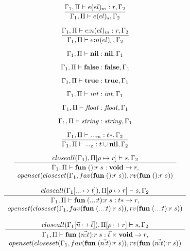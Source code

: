 \[
\dfrac{\Gamma_{1}, \Pi \vdash e(el)_{m}:r, \Gamma_{2}}
      {\Gamma_{1}, \Pi \vdash e(el)_{s},\Gamma_{2}}
\]

\[
\dfrac{\Gamma_{1}, \Pi \vdash e{:}n(el)_{m}:r, \Gamma_{2}}
      {\Gamma_{1}, \Pi \vdash e{:}n(el)_{s},\Gamma_{2}}
\]

\[
\Gamma_{1}, \Pi \vdash \mathbf{nil}:\mathbf{nil}, \Gamma_{1}
\]

\[
\Gamma_{1}, \Pi \vdash \mathbf{false}:\mathbf{false}, \Gamma_{1}
\]

\[
\Gamma_{1}, \Pi \vdash \mathbf{true}:\mathbf{true}, \Gamma_{1}
\]

\[
\Gamma_{1}, \Pi \vdash {\it int}:{\it int}, \Gamma_{1}
\]

\[
\Gamma_{1}, \Pi \vdash {\it float}:{\it float}, \Gamma_{1}
\]

\[
\Gamma_{1}, \Pi \vdash {\it string}:{\it string}, \Gamma_{1}
\]

\[
\dfrac{\Gamma_{1}, \Pi \vdash {...}_{m}:t{*}, \Gamma_{2}}
      {\Gamma_{1}, \Pi \vdash {...}_{e}:t \cup \mathbf{nil}, \Gamma_{2}}
\]

\[
\dfrac{closeall(\Gamma_{1}), \Pi[\rho \mapsto r] \vdash s, \Gamma_{2}}
      {\begin{array}{c}
       \Gamma_{1}, \Pi \vdash \mathbf{fun} \; (){:}r \; s:\mathbf{void} \rightarrow r,\\
       openset(closeset(\Gamma_{1}, fav(\mathbf{fun} \; (){:}r \; s)),rv(\mathbf{fun} \; (){:}r \; s))
       \end{array}}
\]

\[
\dfrac{closeall(\Gamma_{1}[{...} \mapsto t]), \Pi[\rho \mapsto r] \vdash s, \Gamma_{2}}
      {\begin{array}{c}
       \Gamma_{1}, \Pi \vdash \mathbf{fun} \; ({...}{:}t){:}r \; s:t{*} \rightarrow r,\\
       openset(closeset(\Gamma_{1}, fav(\mathbf{fun} \; ({...}{:}t){:}r \; s)),rv(\mathbf{fun} \; ({...}{:}t){:}r \; s))
       \end{array}}
\]

\[
\dfrac{closeall(\Gamma_{1}[\vec{n} \mapsto \vec{t}]), \Pi[\rho \mapsto r] \vdash s, \Gamma_{2}}
      {\begin{array}{c}
       \Gamma_{1}, \Pi \vdash \mathbf{fun} \; (\vec{n{:}t}){:}r \; s:\vec{t} \times \mathbf{void} \rightarrow r,\\
       openset(closeset(\Gamma_{1}, fav(\mathbf{fun} \; (\vec{n{:}t}){:}r \; s)),rv(\mathbf{fun} \; (\vec{n{:}t}){:}r \; s))
       \end{array}}
\]

